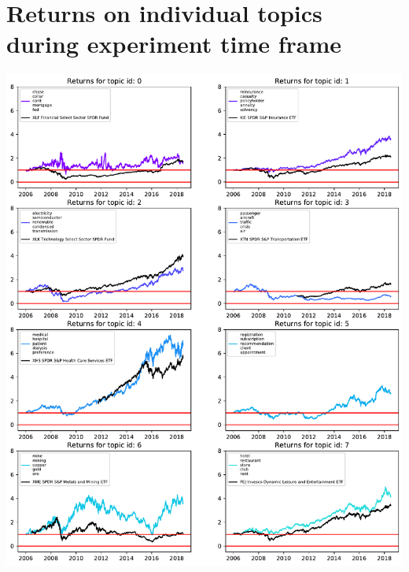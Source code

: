 \documentclass[12pt,journal,letterpaper,oneside,onecolumn]{IEEEtran}
\begin{document}
\section{Returns on individual topics during experiment time frame}
\begin{center}
\includegraphics[width=1\linewidth]{images/returns_per_topic_page_0.pdf}
\end{center}
\end{document}
